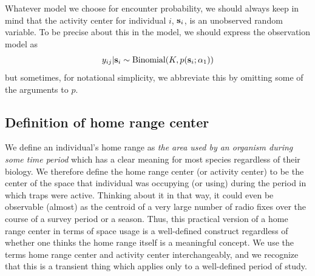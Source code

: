 Whatever model we choose for encounter probability, we should always
keep in mind that the activity center for individual $i$, ${\bf
  s}_{i}$, is an unobserved random variable.  To be precise about this
in the model, we should express the observation model as
\[
y_{ij}|{\bf s}_{i} \sim \mbox{Binomial}(K, p({\bf s}_{i};\alpha_{1}))
\]
but sometimes, for notational simplicity, we abbreviate this by
omitting some of the arguments to $p$.




\subsection{Definition of home range center}

We define an individual's home range as {\it the area used by an
  organism during some time period} which has a clear meaning for most
species regardless of their biology.
We therefore define the
home range center (or activity center) to be the center of the space that individual
was occupying (or using) during the period in which traps were
active. Thinking about it in that way, it could even be observable
(almost) as the centroid of a very large number of radio fixes over
the course of a survey period or a season.  Thus, this practical
version of a home range center in terms of space usage is a
well-defined construct regardless of whether one thinks the home range
itself is a meaningful concept.
  We use the terms home range center and
activity center interchangeably, and we recognize that this is a
transient thing which applies only to a well-defined period of study.


